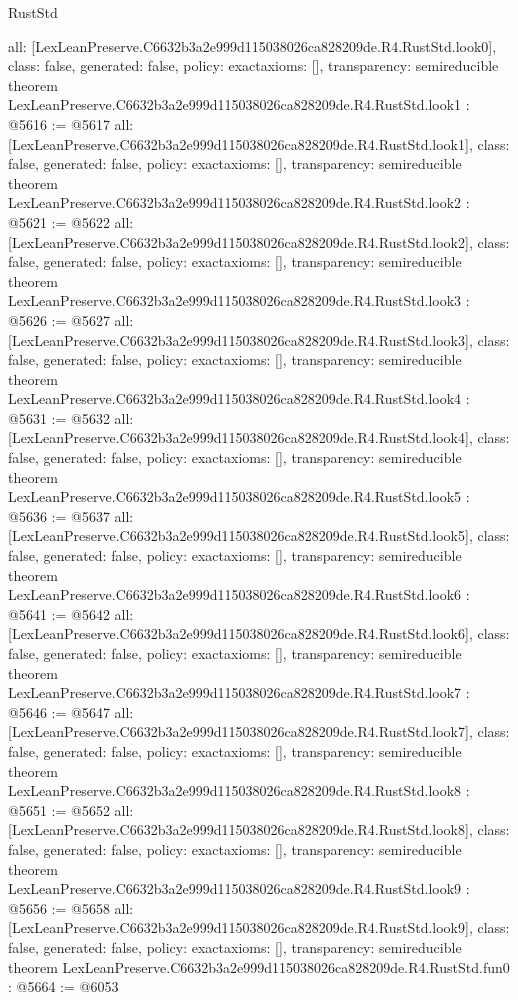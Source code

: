 \begin{lexlean}{RustStd}
\begin{coremodule}
{  all: [LexLeanPreserve.C6632b3a2e999d115038026ca828209de.R4.RustStd.look0],
  class: false,
  generated: false,
  policy: exact{axioms: []},
  transparency: semireducible
}
theorem LexLeanPreserve.C6632b3a2e999d115038026ca828209de.R4.RustStd.look1 : @5616 := @5617 {
  all: [LexLeanPreserve.C6632b3a2e999d115038026ca828209de.R4.RustStd.look1],
  class: false,
  generated: false,
  policy: exact{axioms: []},
  transparency: semireducible
}
theorem LexLeanPreserve.C6632b3a2e999d115038026ca828209de.R4.RustStd.look2 : @5621 := @5622 {
  all: [LexLeanPreserve.C6632b3a2e999d115038026ca828209de.R4.RustStd.look2],
  class: false,
  generated: false,
  policy: exact{axioms: []},
  transparency: semireducible
}
theorem LexLeanPreserve.C6632b3a2e999d115038026ca828209de.R4.RustStd.look3 : @5626 := @5627 {
  all: [LexLeanPreserve.C6632b3a2e999d115038026ca828209de.R4.RustStd.look3],
  class: false,
  generated: false,
  policy: exact{axioms: []},
  transparency: semireducible
}
theorem LexLeanPreserve.C6632b3a2e999d115038026ca828209de.R4.RustStd.look4 : @5631 := @5632 {
  all: [LexLeanPreserve.C6632b3a2e999d115038026ca828209de.R4.RustStd.look4],
  class: false,
  generated: false,
  policy: exact{axioms: []},
  transparency: semireducible
}
theorem LexLeanPreserve.C6632b3a2e999d115038026ca828209de.R4.RustStd.look5 : @5636 := @5637 {
  all: [LexLeanPreserve.C6632b3a2e999d115038026ca828209de.R4.RustStd.look5],
  class: false,
  generated: false,
  policy: exact{axioms: []},
  transparency: semireducible
}
theorem LexLeanPreserve.C6632b3a2e999d115038026ca828209de.R4.RustStd.look6 : @5641 := @5642 {
  all: [LexLeanPreserve.C6632b3a2e999d115038026ca828209de.R4.RustStd.look6],
  class: false,
  generated: false,
  policy: exact{axioms: []},
  transparency: semireducible
}
theorem LexLeanPreserve.C6632b3a2e999d115038026ca828209de.R4.RustStd.look7 : @5646 := @5647 {
  all: [LexLeanPreserve.C6632b3a2e999d115038026ca828209de.R4.RustStd.look7],
  class: false,
  generated: false,
  policy: exact{axioms: []},
  transparency: semireducible
}
theorem LexLeanPreserve.C6632b3a2e999d115038026ca828209de.R4.RustStd.look8 : @5651 := @5652 {
  all: [LexLeanPreserve.C6632b3a2e999d115038026ca828209de.R4.RustStd.look8],
  class: false,
  generated: false,
  policy: exact{axioms: []},
  transparency: semireducible
}
theorem LexLeanPreserve.C6632b3a2e999d115038026ca828209de.R4.RustStd.look9 : @5656 := @5658 {
  all: [LexLeanPreserve.C6632b3a2e999d115038026ca828209de.R4.RustStd.look9],
  class: false,
  generated: false,
  policy: exact{axioms: []},
  transparency: semireducible
}
theorem LexLeanPreserve.C6632b3a2e999d115038026ca828209de.R4.RustStd.fun0 : @5664 := @6053 {
}
\end{coremodule}
\end{lexlean}
